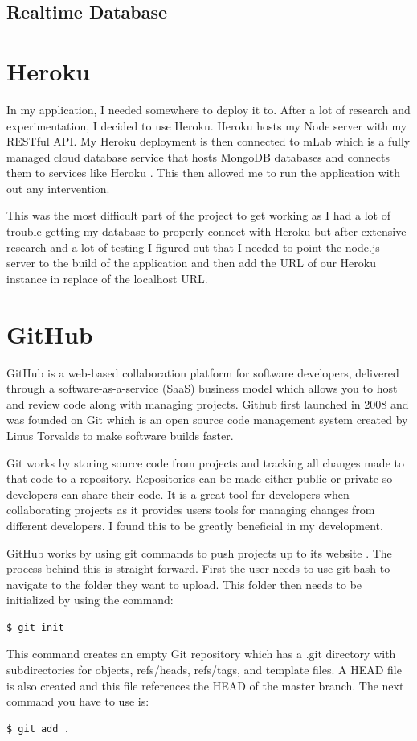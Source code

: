 \subsection{Realtime Database}

\section{Heroku}
In my application, I needed somewhere to deploy it to. After a lot of research and experimentation, I decided to use Heroku\cite{heroku}. Heroku hosts my Node server with my RESTful API. My Heroku deployment is then connected to mLab which is a fully managed cloud database service that hosts MongoDB databases and connects them to services like Heroku \cite{mlab}. This then allowed me to run the application with out any intervention. 

This was the most difficult part of the project to get working as I had a lot of trouble getting my database to properly connect with Heroku but after extensive research and a lot of testing I figured out that I needed to point the node.js server to the build of the application and then add the URL of our Heroku instance in replace of the localhost URL.



\section{GitHub}
GitHub is a web-based collaboration platform for software developers, delivered through a software-as-a-service (SaaS) business model which allows you to host and review code along with managing projects. Github first launched in 2008 and was founded on Git which is an open source code management system created by Linus Torvalds to make software builds faster.\cite{github}

Git works by storing source code from projects and tracking all changes made to that code to a repository. Repositories can be made either public or private so developers can share their code. It is a great tool for developers when collaborating projects as it provides users tools for managing changes from different developers. I found this to be greatly beneficial in my development.

GitHub works by using git commands to push projects up to its website \cite{gitcommands}. The process behind this is straight forward. First the user needs to use git bash to navigate to the folder they want to upload. This folder then needs to be initialized by using the command:
\begin{verbatim}
$ git init
\end{verbatim}
This command creates an empty Git repository which has a .git directory with subdirectories for objects, refs/heads, refs/tags, and template files. A HEAD file is also created and this file references the HEAD of the master branch.
The next command you have to use is:
\begin{verbatim}
$ git add .
\end{verbatim}

